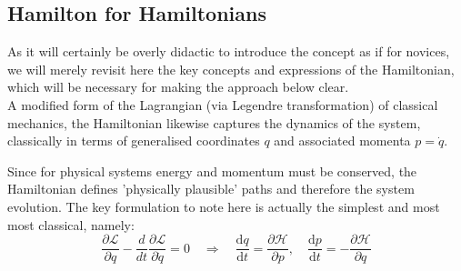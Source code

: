 \documentclass[10 pt, a4paper]{article}
\begin{document}
\subsection{Hamilton for Hamiltonians}
As it will certainly be overly didactic to introduce the concept as if for novices, we will merely revisit here the key concepts and expressions of the Hamiltonian, which will be necessary for making the approach below clear.\\
A modified form of the Lagrangian (via Legendre transformation) of classical mechanics, the Hamiltonian likewise captures the dynamics of the system, classically in terms of generalised coordinates $q$ and associated momenta $p = \dot{q}$.
\begin{comment}
	 While the gradient of the Lagrangian gives us the direction of the greatest change for the system coordinates—the general approach widely used for finding extrema, including in machine learning—the gradient of the Hamiltonian points toward paths in which a given quantity—classically energy, but equivalently conserved quantities can also be used—is conserved, meaning the Hamiltonian can itself represent the total system energy.
	\end{comment} 
Since for physical systems energy and momentum must be conserved, the Hamiltonian defines 'physically plausible' paths and therefore the system evolution. The key formulation to note here is actually the simplest and most most classical, namely: \begin{equation}\label{eq:hamiltonian}\frac{\partial \mathcal L}{\partial q} - \frac{d}{dt}\frac{\partial \mathcal L}{\partial \dot{q}} = 0 \quad\Rightarrow\quad \frac{\mathrm{d}q}{\mathrm{d}t} = \frac{\partial \mathcal H}{\partial p},\quad \frac{\mathrm{d}p}{\mathrm{d}t} = -\frac{\partial \mathcal H}{\partial q}  \end{equation}
\end{document}
